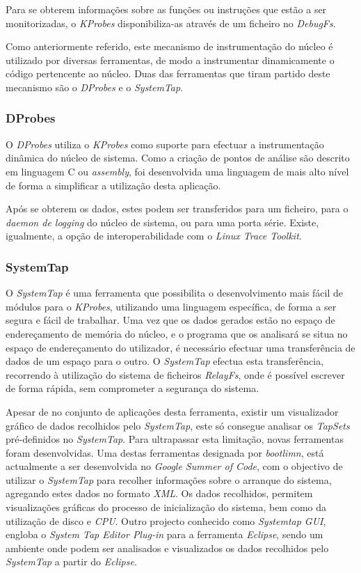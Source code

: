 Para se obterem informações sobre as funções ou instruções que estão a ser monitorizadas, o \textit{KProbes} disponibiliza-as através de um ficheiro no \textit{DebugFs}.

Como anteriormente referido, este mecanismo de instrumentação do núcleo é utilizado por diversas ferramentas, de modo a instrumentar dinamicamente o código pertencente ao núcleo.
Duas das ferramentas que tiram partido deste mecanismo são o \textit{DProbes} e o \textit{SystemTap}.

\subsubsection{DProbes}
O \textit{DProbes} utiliza o \textit{KProbes} como suporte para efectuar a instrumentação dinâmica do núcleo de sistema.
Como a criação de pontos de análise são descrito em linguagem C ou \textit{assembly}, foi desenvolvida uma linguagem de mais alto nível de forma a simplificar a utilização desta aplicação.

Após se obterem os dados, estes podem ser transferidos para um ficheiro, para o \textit{daemon de logging} do núcleo de sistema, ou para uma porta série.
Existe, igualmente, a opção de interoperabilidade com o \textit{Linux Trace Toolkit}\cite{DProbes}.

\subsubsection{SystemTap}
O \textit{SystemTap} é uma ferramenta que possibilita o desenvolvimento mais fácil de módulos para o \textit{KProbes}, utilizando uma linguagem específica, de forma a ser segura e fácil de trabalhar.
Uma vez que os dados gerados estão no espaço de endereçamento de memória do núcleo, e o programa que os analisará se situa no espaço de endereçamento do utilizador, é necessário efectuar uma transferência de dados de um espaço para o outro.
O \textit{SystemTap} efectua esta transferência, recorrendo à utilização do sistema de ficheiros \textit{RelayFs}, onde é possível escrever de forma rápida, sem comprometer a segurança do sistema\cite{Donovan2007,Jones2009}.

Apesar de no conjunto de aplicações desta ferramenta, existir um visualizador gráfico de dados recolhidos pelo \textit{SystemTap}, este só consegue analisar os \textit{TapSets} pré-definidos no \textit{SystemTap}.
Para ultrapassar esta limitação, novas ferramentas foram desenvolvidas.
Uma destas ferramentas designada por \textit{bootlimn}, está actualmente a ser desenvolvida no \textit{Google Summer of Code}, com o objectivo de utilizar o \textit{SystemTap} para recolher informações sobre o arranque do sistema, agregando estes dados no formato \textit{XML}.
Os dados recolhidos, permitem visualizações gráficas do processo de inicialização do sistema, bem como da utilização de disco e \textit{CPU}.
Outro projecto conhecido como \textit{Systemtap GUI}, engloba o \textit{System Tap Editor Plug-in} para a ferramenta \textit{Eclipse}, sendo um ambiente onde podem ser analisados e visualizados os dados recolhidos pelo \textit{SystemTap} a partir do \textit{Eclipse}.

